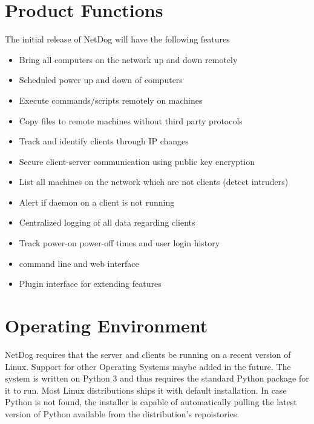 \documentclass{scrreprt}
\begin{document}
\section{Product Functions}
The initial release of NetDog will have the following features\\
\begin{itemize}
\item Bring all computers on the network up and down remotely\\
\item Scheduled power up and down of computers\\
\item Execute commands/scripts remotely on machines\\
\item Copy files to remote machines without third party protocols\\
\item Track and identify clients through IP changes\\
\item Secure client-server communication using public key encryption\\
\item List all machines on the network which are not clients (detect intruders)\\
\item Alert if daemon on a client is not running\\
\item  Centralized logging of all data regarding clients\\
\item Track power-on power-off times and user login history\\
\item command line and web interface\\
\item Plugin interface for extending features
\end{itemize}

\section{Operating Environment}
NetDog requires that the server and clients be running on a recent version of
Linux. Support for other Operating Systems maybe added in the future. The
system is written on Python 3 and thus requires the standard Python package
for it to run. Most Linux distributions ships it with default installation. In
case Python is not found, the installer is capable of automatically pulling the
latest version of Python available from the distribution's repoistories.
\end{document}
